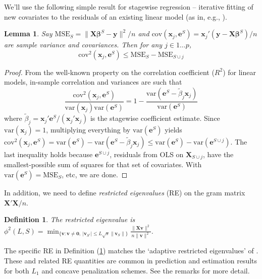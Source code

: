 \documentclass[12pt]{article}
\newtheorem{definition}{\sc Definition}[section]
\newtheorem{lemma}{\sc Lemma}[section]
\newcommand{\bs}[1]{\boldsymbol{#1}}
\newcommand{\mr}[1]{\mathrm{#1}}
\newcommand{\bm}[1]{\mathbf{#1}}
\begin{document}
We'll use the following simple result for stagewise regression -- iterative fitting of new covariates to the residuals of an existing linear model (as in, e.g., \citealt{goldberger_stepwise_1961}). 
\begin{lemma}\label{SSElemma}
Say $\mr{MSE}_S = \|\bm{X}\bs{\beta}^S-\bm{y}\|^2/n$ and 
$\mr{cov}(\bs{x}_j,\bm{e}^S) = \bs{x}_j'(\bm{y}-\bm{X}\bs{\beta}^S)/n$ are sample variance and covariances.  Then for any $j \in 1\ldots p$, 
\[
\mr{cov}^2(\bs{x}_j,\bm{e}^S) \leq \mr{MSE}_S - \mr{MSE}_{S\cup j}
\]
\end{lemma}
\begin{proof}
From the well-known property on the correlation coefficient ($R^2$) for linear models,   
in-sample correlation and variances are such that
\[
\frac{\mr{cov}^2(\bs{x}_j,\bm{e}^S)}{\mr{var}(\bs{x}_j)\mr{var}(\bm{e}^S)} = 1 - \frac{\mr{var}(\bm{e}^S-\tilde\beta_j\bs{x}_j)}{\mr{var}(\bm{e}^S)}
\]
where $\tilde\beta_j = \bs{x}_j'\bm{e}^S/(\bs{x}_j'\bs{x}_j)$ is the stagewise coefficient estimate.  Since $\mr{var}(\bs{x}_j)=1$, multiplying everything by $\mr{var}(\bm{e}^S)$ yields $\mr{cov}^2(\bs{x}_j,\bm{e}^S) =
\mr{var}(\bm{e}^S) - \mr{var}(\bm{e}^S-\tilde\beta_j\bs{x}_j)
\leq \mr{var}(\bm{e}^S) - \mr{var}(\bm{e}^{S\cup j})$.
The last inequality holds because $\bm{e}^{S\cup j}$, residuals from OLS on $\bm{X}_{S\cup j}$, have the smallest-possible sum of squares for that set of covariates.  With $\mr{var}(\bm{e}^S) = \mr{MSE}_S$, etc, we are done.
\end{proof}

In addition, we need to define {\it restricted eigenvalues} (RE) on the gram matrix $\bm{X}'\bm{X}/n$.  
\begin{definition}\label{redef}
The restricted eigenvalue is
$
\phi^2(L,S) = \min_{\{\bm{v}: \bm{v}\neq \bm{0},~|\bm{v}_{S^c}| \leq L\sqrt{s}\|\bm{v}_S\|\}}\frac{\|\bm{X}\bm{v}\|^2}{n\|\bm{v}\|^2}$.
\end{definition}
\noindent The specific RE in Definition (\ref{redef}) matches the `adaptive restricted eigenvalues' of \cite{buhlmann_statistics_2011}.  These and related RE quantities are common in prediction and estimation results for both $L_1$ and concave penalization schemes.  See the remarks for more detail.
\end{document}
